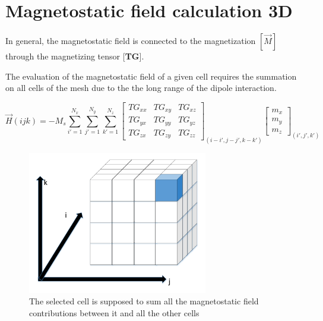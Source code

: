 \chapter{Magnetostatic field calculation 3D}
In general, the magnetostatic field is connected to the magnetization $ [\overrightarrow{M}] $ through the magnetizing tensor [\textbf{TG}].


  The evaluation of the magnetostatic field of a given cell requires the summation on all cells of the mesh due to the the long range of the dipole interaction.
  
  \begin{equation} \label{3d_formula}
  	\overrightarrow{H}(ijk)=-M_{s}\sum\limits_{i'=1}^{N_{x}} \sum\limits_{j'=1}^{N_{y}}\sum\limits_{k'=1}^{N_{z}}\begin{bmatrix}
  	TG_{xx} & TG_{xy} & TG_{xz}\\
  	TG_{yx} & TG_{yy}& TG_{yz}    	\\
  	TG_{zx}&TG_{zy} & TG_{zz}  
  	\end{bmatrix}_{(i-i',j-j',k-k')}\begin{bmatrix}
  	m_{x}\\
  	m_{y}\\
  	m_{z}\end{bmatrix}_{(i',j',k')}
  \end{equation}
  
\begin{figure}[h]
	\centering
	\includegraphics[width=0.7\textwidth]{imm/3d/cube.pdf}  
	\caption{The selected cell is supposed to sum all the magnetostatic field contributions between it and all the other cells}
	\label{fig:cube}
\end{figure}
  
  \clearpage
